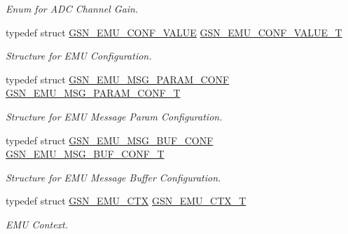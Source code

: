 \begin{DoxyCompactItemize}
\begin{DoxyCompactList}\small\item\em Enum for ADC Channel Gain. \end{DoxyCompactList}\item 
typedef struct \hyperlink{a00058}{GSN\_\-EMU\_\-CONF\_\-VALUE} \hyperlink{a00663_ga4d86ed7ecbdc155ecc41c47de7739775}{GSN\_\-EMU\_\-CONF\_\-VALUE\_\-T}
\begin{DoxyCompactList}\small\item\em Structure for EMU Configuration. \end{DoxyCompactList}\item 
typedef struct \hyperlink{a00064}{GSN\_\-EMU\_\-MSG\_\-PARAM\_\-CONF} \hyperlink{a00663_gae3dd9cf1f519ba6879f6f928ac33c1c4}{GSN\_\-EMU\_\-MSG\_\-PARAM\_\-CONF\_\-T}
\begin{DoxyCompactList}\small\item\em Structure for EMU Message Param Configuration. \end{DoxyCompactList}\item 
typedef struct \hyperlink{a00063}{GSN\_\-EMU\_\-MSG\_\-BUF\_\-CONF} \hyperlink{a00663_gacf296ce2d4fd56e05d1ddfc4e41e07ce}{GSN\_\-EMU\_\-MSG\_\-BUF\_\-CONF\_\-T}
\begin{DoxyCompactList}\small\item\em Structure for EMU Message Buffer Configuration. \end{DoxyCompactList}\item 
typedef struct \hyperlink{a00059}{GSN\_\-EMU\_\-CTX} \hyperlink{a00663_gaf9de9f7ae5f3e644a9f1ad8df793ec4f}{GSN\_\-EMU\_\-CTX\_\-T}
\begin{DoxyCompactList}\small\item\em EMU Context. \end{DoxyCompactList}\end{DoxyCompactItemize}
